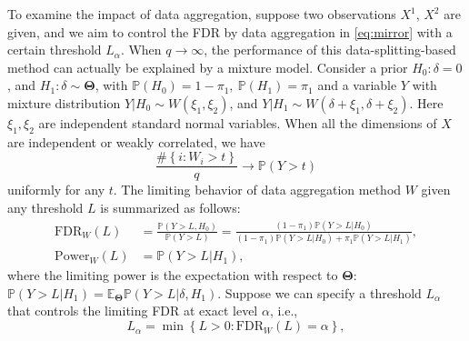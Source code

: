 \documentclass[12pt]{article}
\newcommand{\PP}{\mathbb{P}}
\newcommand{\E}{\mathbb{E}}
\def\PP{{\mathbb P}}
\theoremstyle{plain}
\begin{document}
To examine the impact of data aggregation, suppose two observations $X^1$, $X^2$ are given, and we aim to control the FDR by data aggregation in \eqref{eq:mirror} with a certain threshold $L_\alpha$. When $q \to \infty$, the performance of this data-splitting-based method can actually be explained by a mixture model. Consider a prior $H_0: \delta=0$, and $H_1: \delta\sim \mathbf{\Theta} $, with $\PP(H_0)=1-\pi_1, \ \PP(H_1)=\pi_1$ and a variable $Y$ with mixture distribution $Y|H_0\sim W(\xi_1,\xi_2)$, and $Y|H_1\sim W(\delta+\xi_1,\delta+\xi_2)$. Here $\xi_1, \xi_2$ are independent standard normal variables. When   all the dimensions of $X$ are independent or weakly correlated, we have 
\begin{equation*}
	\frac{\#\left\{i: W_i>t\right\}}{q} \to \PP(Y>t) 
\end{equation*}
uniformly for any $t$. 
The limiting behavior of data aggregation method $W$ given any threshold $L$ is summarized as follows:
\begin{equation}\label{eq:limiting_fdr}
	\begin{aligned}
		\text{FDR}_W (L) &= \frac{\PP(Y>L,H_0)}{ \PP(Y>L) } = \frac{(1-\pi_1)\PP(Y>L|H_0)}{(1-\pi_1)\PP(Y>L|H_0) + \pi_1 \PP(Y>L|H_1) },  \\
		\text{Power}_W(L) & = \PP(Y>L|H_1),
	\end{aligned}
\end{equation}
where the limiting power is the expectation with respect to $ \mathbf{\Theta}  $: $\PP(Y>L|H_1) = \E_{\mathbf{\Theta}} \PP(Y>L|\delta,H_1)$. Suppose we can specify a  threshold $L_\alpha$ that controls the limiting FDR at exact level $\alpha$, i.e.,
\begin{equation}\label{eq:limiting_thres}
	L_\alpha =\min \left\{L>0: \text{FDR}_W ( L) = \alpha\right\}, 
\end{equation}
\end{document}
